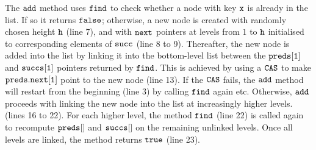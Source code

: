 The $\tt add$ method uses $\tt find$ to check whether a node with key $\tt x$ is already in the list. If so it returns $\tt false$; otherwise, a new node is created with randomly chosen height $\tt h$ (line 7), and with $\tt next$ pointers at levels from $1$ to $\tt h$  initialised to corresponding elements of $\tt succ$ (line 8 to 9). Thereafter, the new node is added into the list by linking it into the bottom-level list between the $\tt preds[1]$ and $\tt succs[1]$ pointers returned by $\tt find$. This is achieved by using a $\tt CAS$ to make $\tt preds.next[1]$ point to the new node (line 13). If the $\tt CAS$ fails, the $\tt add$ method will restart from the beginning (line 3) by calling $\tt find$ again etc. Otherwise, $\tt add$ proceeds with linking the new node into the list at increasingly higher levels. (lines 16 to 22). For each higher level, the method $\tt find$ (line 22) is called again to recompute $\tt preds[]$ and $\tt succs[]$ on the remaining unlinked levels. Once all levels are linked, the method returns $\tt true$ (line 23).

 


